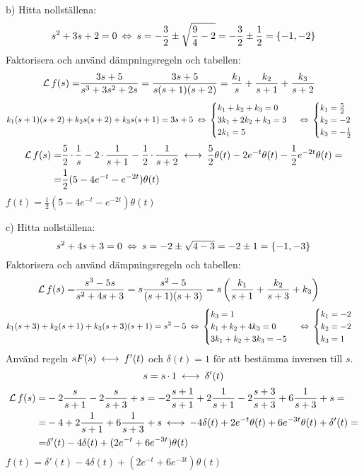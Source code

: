 \begin{task}{b)}
	Hitta nollställena:
	\[s^2+3s+2=0 \lra
	s=-\frac{3}{2}\pm\sqrt{\frac{9}{4}-2}=
	-\frac{3}{2}\pm\frac{1}{2}=\{-1,-2\}\]
	Faktorisera och använd dämpningsregeln och tabellen:
	\begin{align*}
	\operatorname{\mathcal{L}} f(s)=
	&\frac{3s+5}{s^3+3s^2+2s}=
	\frac{3s+5}{s(s+1)(s+2)}=
	\frac{k_1}{s}+\frac{k_2}{s+1}+\frac{k_3}{s+2}
	\end{align*}
	\[k_1(s+1)(s+2)+k_2s(s+2)+k_3s(s+1)=3s+5 \lra
	\begin{cases}
	k_1+k_2+k_3=0 \\
	3k_1+2k_2+k_3=3 \\
	2k_1=5
	\end{cases} \lra
	\begin{cases}
	k_1=\frac{5}{2} \\
	k_2=-2 \\
	k_3=-\frac{1}{2}
	\end{cases} \]
	\begin{align*}
	\laplace f(s)=
	&\frac{5}{2}\*\frac{1}{s}-2\*\frac{1}{s+1}-\frac{1}{2}\*\frac{1}{s+2} \llra
	\frac{5}{2}\theta(t)-2e^{-t}\theta(t)-\frac{1}{2}e^{-2t}\theta(t)= \\ =
	&\frac{1}{2}(5-4e^{-t}-e^{-2t})\theta(t)
	\end{align*}
	\ans $f(t)=\frac{1}{2}(5-4e^{-t}-e^{-2t})\theta(t)$
\end{task}

\begin{task}{c)}
	Hitta nollställena:
	\[s^2+4s+3=0 \lra
	s=-2\pm\sqrt{4-3}=
	-2\pm1=\{-1,-3\}\]
	Faktorisera och använd dämpningsregeln och tabellen:
	\begin{align*}
	\operatorname{\mathcal{L}} f(s)=
	&\frac{s^3-5s}{s^2+4s+3}=
	s\frac{s^2-5}{(s+1)(s+3)}=
	s\left(\frac{k_1}{s+1}+\frac{k_2}{s+3}+k_3\right)
	\end{align*}
	\[k_1(s+3)+k_2(s+1)+k_3(s+3)(s+1)=s^2-5 \lra
	\begin{cases}
	k_3=1 \\
	k_1+k_2+4k_3=0 \\
	3k_1+k_2+3k_3=-5
	\end{cases} \lra
	\begin{cases}
	k_1=-2 \\
	k_2=-2 \\
	k_3=1
	\end{cases} \]
	Använd regeln $sF(s)\llra f'(t)$ och $\delta(t)=1$ för att bestämma inversen till $s$.
	\[s=s\*1\llra\delta'(t)\]
	\begin{align*}
	\laplace f(s)=
	&-2\frac{s}{s+1}-2\frac{s}{s+3}+s =
	-2\frac{s+1}{s+1}+2\frac{1}{s+1}-2\frac{s+3}{s+3}+6\frac{1}{s+3}+s= \\ =
	&-4+2\frac{1}{s+1}+6\frac{1}{s+3}+s\llra
	-4\delta(t)+2e^{-t}\theta(t)+6e^{-3t}\theta(t)+\delta'(t)= \\ =
	&\delta'(t)-4\delta(t)+(2e^{-t}+6e^{-3t})\theta(t)
	\end{align*}
	\ans $f(t)=\delta'(t)-4\delta(t)+(2e^{-t}+6e^{-3t})\theta(t)$
\end{task}


